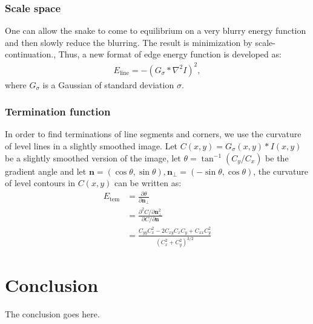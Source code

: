 \documentclass[journal]{IEEEtran}
\begin{document}
\subsubsection{Scale space}
One can allow the snake to come to equilibrium on a very blurry energy function and then slowly reduce the blurring. The result is minimization by scale-continuation.\cite{s20},\cite{s21} Thus, a new format of edge energy function is developed as:
\begin{equation}\begin{aligned}
E_{\text{line}}=-(G_\sigma * \nabla^2I)^2,
\end{aligned}\end{equation}
where $G_\sigma$ is a Gaussian of standard deviation $\sigma$.
\subsubsection{Termination function}
In order to find terminations of line segments and corners, we use the curvature of level lines in a slightly smoothed image. Let $C(x,y)=G_\sigma(x,y)*I(x,y)$ be a slightly smoothed version of the image, let $\theta=\tan^{-1}{(C_y/C_x)}$ be the gradient angle and let $\mathbf{n}=(\cos \theta,\sin\theta),\mathbf{n}_\perp=(-\sin\theta,\cos\theta)$, the curvature of level contours in $C(x,y)$ can be written as:
\begin{equation}\begin{aligned}
    E_{\mathrm{tem}} &=\frac{\partial \theta}{\partial \mathbf{n}_{\perp}} \\
    &=\frac{\partial^{2} C / \partial \mathbf{n}_{\perp}^{2}}{\partial C / \partial \mathbf{n}} \\
    &=\frac{C_{y y} C_{x}^{2}-2 C_{x y} C_{x} C_{y}+C_{x x} C_{y}^{2}}{\left(C_{x}^{2}+C_{y}^{2}\right)^{3 / 2}}
\end{aligned}\end{equation}

\section{Conclusion}
The conclusion goes here.\cite{han2020survey}

\ifCLASSOPTIONcaptionsoff
  \newpage
\fi



\end{document}
